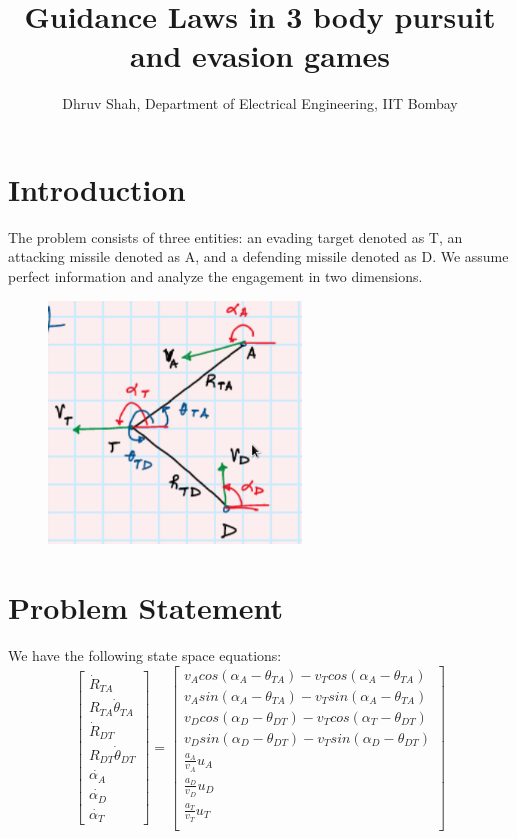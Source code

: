 \documentclass[11pt]{article}
\title{Guidance Laws in 3 body pursuit and evasion games}
\author{Dhruv Shah, Department of Electrical Engineering, IIT Bombay}
\date{ }
\theoremstyle{definition}
\theoremstyle{remark}
\begin{document}
\maketitle
\tableofcontents
\newpage
\section{Introduction}
The problem consists of three entities: an evading target denoted as
T, an attacking missile denoted as A, and a defending missile
denoted as D. We assume perfect information and analyze the
engagement in two dimensions.\\
\begin{figure}
    \centering
    \includegraphics[width=0.6\textwidth]{tad_state_space.png}
    \caption{}
\end{figure}

\section{Problem Statement}\label{sec:2}
We have the following state space equations:  
\[
\begin{bmatrix}
\dot{R}_{TA} \\ R_{TA} \dot{\theta}_{TA}  \\ \dot{R}_{DT}  \\ R_{DT}\dot{\theta}_{DT}  \\ \dot{\alpha_A} \\  \dot{\alpha_D} \\ \dot{\alpha_T} 
\end{bmatrix}
=
\begin{bmatrix}
v_A cos(\alpha_A - \theta_{TA}) - v_T cos(\alpha_A - \theta_{TA}) \\
v_A sin(\alpha_A - \theta_{TA}) - v_T sin(\alpha_A - \theta_{TA}) \\
v_D cos(\alpha_D - \theta_{DT}) - v_T cos(\alpha_T - \theta_{DT}) \\
v_D sin(\alpha_D - \theta_{DT}) - v_T sin(\alpha_D - \theta_{DT}) \\
\frac{a_A}{v_A} u_A \\
\frac{a_D}{v_D} u_D \\
\frac{a_T}{v_T} u_T \\
\end{bmatrix}
\]
\end{document}
